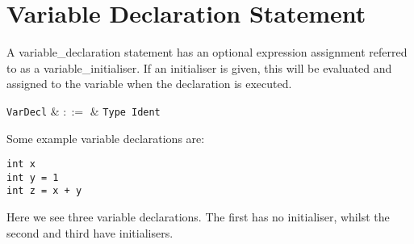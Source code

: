 \section{Variable Declaration Statement}
\label{c_stmts_var_decl}
A \gls{variable_declaration} statement has an optional expression assignment referred to as a \gls{variable_initialiser}.  If an initialiser is given, this will be evaluated and assigned to the variable when the declaration is executed.  

\begin{syntax}
  \verb+VarDecl+ & $::=$ & \verb+Type+\ \verb+Ident+\ \big[\
  \token{=}\ \verb+Expr+\ \big]\\
\end{syntax}

\noindent Some example variable declarations are:
\begin{lstlisting}
int x
int y = 1
int z = x + y
\end{lstlisting}
Here we see three variable declarations.  The first has no initialiser, whilst the second and third have initialisers.
